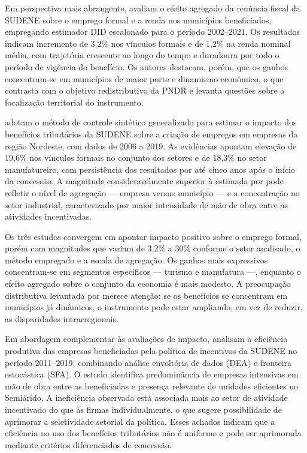 Em perspectiva mais abrangente,  avaliam o efeito agregado da renúncia fiscal da SUDENE sobre o emprego formal e a renda nos municípios beneficiados, empregando estimador DID escalonado para o período 2002--2021. Os resultados indicam incremento de 3,2\% nos vínculos formais e de 1,2\% na renda nominal média, com trajetória crescente ao longo do tempo e duradoura por todo o período de vigência do benefício. Os autores destacam, porém, que os ganhos concentram-se em municípios de maior porte e dinamismo econômico, o que contrasta com o objetivo redistributivo da PNDR e levanta questões sobre a focalização territorial do instrumento.

 adotam o método de controle sintético generalizado para estimar o impacto dos benefícios tributários da SUDENE sobre a criação de empregos em empresas da região Nordeste, com dados de 2006 a 2019. As evidências apontam elevação de 19,6\% nos vínculos formais no conjunto dos setores e de 18,3\% no setor manufatureiro, com persistência dos resultados por até cinco anos após o início da concessão. A magnitude consideravelmente superior à estimada por  pode refletir o nível de agregação --- empresa versus município --- e a concentração no setor industrial, caracterizado por maior intensidade de mão de obra entre as atividades incentivadas.

Os três estudos convergem em apontar impacto positivo sobre o emprego formal, porém com magnitudes que variam de 3,2\% a 30\% conforme o setor analisado, o método empregado e a escala de agregação. Os ganhos mais expressivos concentram-se em segmentos específicos --- turismo e manufatura ---, enquanto o efeito agregado sobre o conjunto da economia é mais modesto. A preocupação distributiva levantada por  merece atenção: se os benefícios se concentram em municípios já dinâmicos, o instrumento pode estar ampliando, em vez de reduzir, as disparidades intrarregionais.

Em abordagem complementar às avaliações de impacto,  analisam a eficiência produtiva das empresas beneficiadas pela política de incentivos da SUDENE no período 2011--2019, combinando análise envoltória de dados (DEA) e fronteira estocástica (SFA). O estudo identifica predominância de empresas intensivas em mão de obra entre as beneficiadas e presença relevante de unidades eficientes no Semiárido. A ineficiência observada está associada mais ao setor de atividade incentivado do que às firmas individualmente, o que sugere possibilidade de aprimorar a seletividade setorial da política. Esses achados indicam que a eficiência no uso dos benefícios tributários não é uniforme e pode ser aprimorada mediante critérios diferenciados de concessão.

